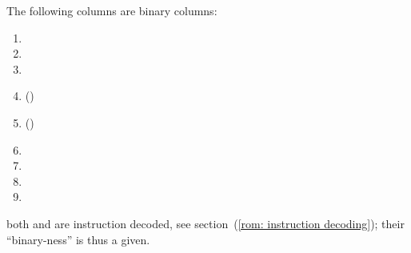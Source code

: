 The following columns are binary columns:
\begin{multicols}{3}
    \begin{enumerate}
	\item \romColumnPadding{}
	\item \romColumnClaimedByPush{}
	\item \PFB{}
	\item \romColumnOpcodeIsPush{} \quad (\trash)
	\item \romColumnOpcodeIsJumpDest{} \quad (\trash)
	\item[\vspace{\fill}]
	\item \romColumnEmptyCode    {}
	\item \romColumnNonemptyCode {}
	\item \done                  {}
    \end{enumerate}
\end{multicols}
\saNote{}
both \romColumnOpcodeIsPush{} and \romColumnOpcodeIsJumpDest{} are instruction decoded, see section~(\ref{rom: instruction decoding}); their ``binary-ness'' is thus a given.
